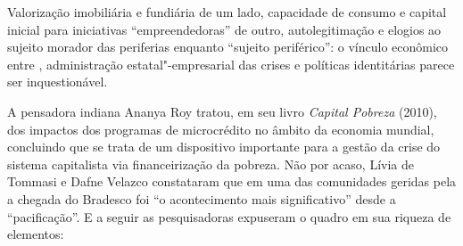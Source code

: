 Valorização imobiliária e fundiária de um lado, capacidade de consumo e
capital inicial para iniciativas ``empreendedoras'' de outro,
autolegitimação e elogios ao sujeito morador das periferias enquanto
``sujeito periférico'': o vínculo econômico entre , administração
estatal"-empresarial das crises e políticas identitárias parece ser
inquestionável.

A pensadora indiana Ananya Roy tratou, em seu livro \emph{Capital
Pobreza} (2010), dos impactos dos programas de microcrédito no âmbito da
economia mundial, concluindo que se trata de um dispositivo importante
para a gestão da crise do sistema capitalista via financeirização da
pobreza. Não por acaso, Lívia de Tommasi e Dafne Velazco constataram que
em uma das comunidades geridas pela  a chegada do Bradesco foi ``o
acontecimento mais significativo'' desde a ``pacificação''. E a seguir
as pesquisadoras expuseram o quadro em sua riqueza de elementos:

